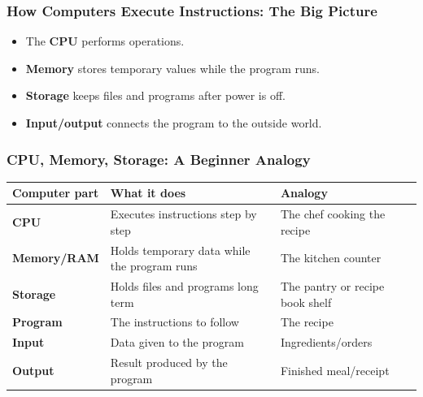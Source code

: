 \documentclass[aspectratio=169,10pt]{beamer}
\newcommand{\keyword}[1]{\textcolor{PrimaryBlue}{\textbf{#1}}}
\newcommand{\myitem}[1]{\item #1\vspace{0.04cm}}
\begin{document}
\begin{frame}
\frametitle{How Computers Execute Instructions: The Big Picture}
\vspace{1.1cm}
\centering
{}

\vspace{0.65cm}
\raggedright
\begin{itemize}
  \myitem{The \keyword{CPU} performs operations.}
  \myitem{\keyword{Memory} stores temporary values while the program runs.}
  \myitem{\keyword{Storage} keeps files and programs after power is off.}
  \myitem{\keyword{Input/output} connects the program to the outside world.}
\end{itemize}
\end{frame}


\begin{frame}
\frametitle{CPU, Memory, Storage: A Beginner Analogy}
\vspace{1.0cm}
\small
\renewcommand{\arraystretch}{1.25}
\begin{center}
\begin{tabularx}{0.96\textwidth}{>{\bfseries}p{2.6cm} X X}
\toprule
Computer part & What it does & Analogy \\
\midrule
CPU & Executes instructions step by step & The chef cooking the recipe \\
Memory/RAM & Holds temporary data while the program runs & The kitchen counter \\
Storage & Holds files and programs long term & The pantry or recipe book shelf \\
Program & The instructions to follow & The recipe \\
Input & Data given to the program & Ingredients/orders \\
Output & Result produced by the program & Finished meal/receipt \\
\bottomrule
\end{tabularx}
\end{center}
\end{frame}
\end{document}
